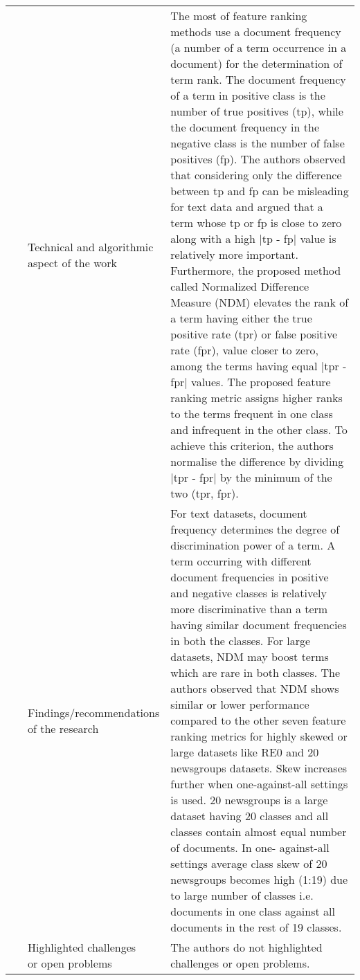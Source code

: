 \begin{landscape}
\begin{longtable}{lp{}p{}}
	\multirow{3}[0]{*}{~\citep{Rehman2017}} & 
    \specialcell{Technical and algorithmic \\ aspect of the work} &
	The most of feature ranking methods use a document frequency (a number of a term occurrence in a document) for the determination of term rank. The document frequency of a term in positive class is the number of true positives (tp), while the document frequency in the negative class is the number of false positives (fp). The authors observed that considering only the difference between tp and fp can be misleading for text data and argued that a term whose tp or fp is close to zero along with a high |tp - fp| value is relatively more important. Furthermore, the proposed method called Normalized Difference Measure (NDM) elevates the rank of a term having either the true positive rate (tpr) or false positive rate (fpr), value closer to zero, among the terms having equal |tpr - fpr| values. The proposed feature ranking metric assigns higher ranks to the terms frequent in one class and infrequent in the other class. To achieve this criterion, the authors normalise the difference by dividing |tpr - fpr| by the minimum of the two (tpr, fpr).    
    \\ & 
    \specialcell{Findings/recommendations \\ of the research} & 
	For text datasets, document frequency determines the degree of discrimination power of a term. A term occurring with different document frequencies in positive and negative classes is relatively more discriminative than a term having similar document frequencies in both the classes. For large datasets, NDM may boost terms which are rare in both classes. The authors observed that NDM shows similar or lower performance compared to the other seven feature ranking metrics for highly skewed or large datasets like RE0 and 20 newsgroups datasets. Skew increases further when one-against-all settings is used. 20 newsgroups is a large dataset having 20 classes and all classes contain almost equal number of documents. In one- against-all settings average class skew of 20 newsgroups becomes high (1:19) due to large number of classes i.e. documents in one class against all documents in the rest of 19 classes.
    \\ & 
    \specialcell{Highlighted challenges \\ or open problems} & 
	The authors do not highlighted challenges or open problems.
	\\
	

\end{longtable}
\end{landscape}
